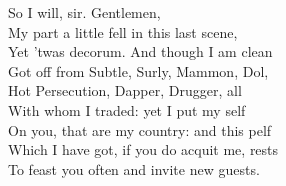 \documentclass[a4paper,oneside,12pt]{memoir}
\begin{document}
\begin{drama*}
\facespeaks {} So I will, sir. Gentlemen,\\
My part a little fell in this last scene,\\
Yet 'twas decorum. And though I am clean\\
Got off from Subtle, Surly, Mammon, Dol,\\
Hot Persecution, Dapper, Drugger, all\\
With whom I traded: yet I put my self\\
On you, that are my country: and this pelf\\
Which I have got, if you do acquit me, rests\\
To feast you often and invite new guests.\\

\end{drama*}
\end{document}
